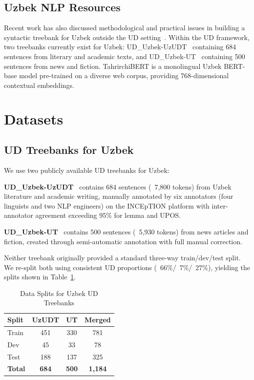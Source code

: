 \documentclass[10pt,conference,a4paper]{IEEEtran_EDM}
\begin{document}
\subsection{Uzbek NLP Resources}

Recent work has also discussed methodological and practical issues in building a syntactic treebank for Uzbek outside the UD setting~\cite{uztreebank-esref}. Within the UD framework, two treebanks currently exist for Uzbek: UD\_Uzbek-UzUDT~\cite{matlatipov2025uzudt} containing 684 sentences from literary and academic texts, and UD\_Uzbek-UT~\cite{akhundjanova2025universal} containing 500 sentences from news and fiction. TahrirchiBERT is a monolingual Uzbek BERT-base model pre-trained on a diverse web corpus, providing 768-dimensional contextual embeddings.

\section{Datasets}

\subsection{UD Treebanks for Uzbek}

We use two publicly available UD treebanks for Uzbek:

\textbf{UD\_Uzbek-UzUDT}~\cite{matlatipov2025uzudt} contains 684 sentences (~7,800 tokens) from Uzbek literature and academic writing, manually annotated by six annotators (four linguists and two NLP engineers) on the INCEpTION platform with inter-annotator agreement exceeding 95\% for lemma and UPOS.

\textbf{UD\_Uzbek-UT}~\cite{akhundjanova2025universal} contains 500 sentences (~5,930 tokens) from news articles and fiction, created through semi-automatic annotation with full manual correction.

Neither treebank originally provided a standard three-way train/dev/test split. We re-split both using consistent UD proportions (~66\%/~7\%/~27\%), yielding the splits shown in Table~\ref{tab:splits}.

\begin{table}[htbp]
\caption{Data Splits for Uzbek UD Treebanks}
\begin{center}
\begin{tabular}{lccc}
\toprule
\textbf{Split} & \textbf{UzUDT} & \textbf{UT} & \textbf{Merged} \\
\midrule
Train & 451 & 330 & 781 \\
Dev & 45 & 33 & 78 \\
Test & 188 & 137 & 325 \\
\midrule
\textbf{Total} & \textbf{684} & \textbf{500} & \textbf{1,184} \\
\bottomrule
\end{tabular}
\label{tab:splits}
\end{center}
\end{table}
\end{document}
